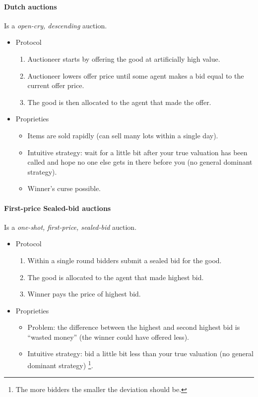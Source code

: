 \documentclass[10pt,a4paper]{article}
\begin{document}
\paragraph{Dutch auctions}
Is a \textit{open-cry, descending} auction. 

\begin{itemize}
\item Protocol
\begin{enumerate}
\item Auctioneer starts by offering the good at artificially high value.
\item  Auctioneer lowers offer price until some agent makes a bid equal to the current offer price.
\item The good is then allocated to the agent that made the offer.
\end{enumerate}

\item Proprieties
\begin{itemize}
\item Items are sold rapidly (can sell many lots within a single day).
\item  Intuitive strategy: wait for a little bit after your true valuation has been called and hope no one else gets in there before you (no general dominant strategy).
\item Winner’s curse possible.
\end{itemize}
\end{itemize}



\paragraph{First-price Sealed-bid auctions}
Is a \textit{one-shot, first-price, sealed-bid} auction. 

\begin{itemize}
\item Protocol
\begin{enumerate}
\item Within a single round bidders submit a sealed bid for the good.
\item  The good is allocated to the agent that made highest bid.
\item  Winner pays the price of highest bid.
\end{enumerate}

\item Proprieties
\begin{itemize}
\item Problem: the difference between the highest and second highest bid is “wasted money” (the winner could have offered less).
\item  Intuitive strategy: bid a little bit less than your true valuation (no general dominant strategy) \footnote{The more bidders the smaller the deviation should be.}.
\end{itemize}
\end{itemize}
\end{document}
